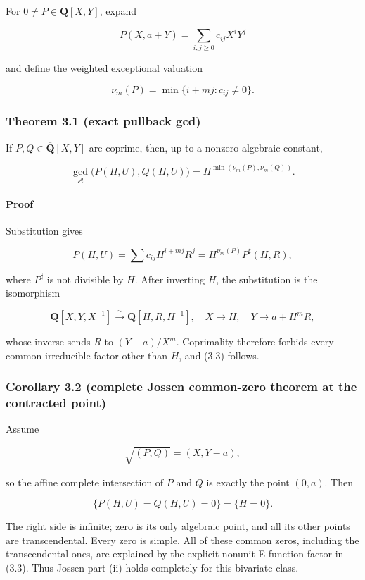 \documentclass[11pt]{article}
\theoremstyle{keio}
\theoremstyle{definition}
\theoremstyle{remark}
\begin{document}
For \(0\ne P\in\overline{\mathbf Q}[X,Y]\), expand

\[
  P(X,a+Y)=\sum_{i,j\ge0}c_{ij}X^iY^j
\]

and define the weighted exceptional valuation

\[
  \nu_m(P)=\min\{i+mj:c_{ij}\ne0\}.                          \tag{J-3.2}
\]

\subsubsection{Theorem 3.1 (exact pullback gcd)}

If \(P,Q\in\overline{\mathbf Q}[X,Y]\) are coprime, then, up to a nonzero
algebraic constant,

\[
 \gcd_{\mathscr A}\bigl(P(H,U),Q(H,U)\bigr)
 =H^{\min(\nu_m(P),\nu_m(Q))}.                               \tag{J-3.3}
\]

\paragraph{Proof}

Substitution gives

\[
  P(H,U)=\sum c_{ij}H^{i+mj}R^j
         =H^{\nu_m(P)}P^\sharp(H,R),
\]

where \(P^\sharp\) is not divisible by \(H\). After inverting \(H\), the
substitution is the isomorphism

\[
 \overline{\mathbf Q}[X,Y,X^{-1}]
 \xrightarrow{\sim}
 \overline{\mathbf Q}[H,R,H^{-1}],
 \quad X\mapsto H,\quad Y\mapsto a+H^mR,
\]

whose inverse sends \(R\) to \((Y-a)/X^m\). Coprimality therefore forbids
every common irreducible factor other than \(H\), and (3.3) follows.

\subsubsection{Corollary 3.2 (complete Jossen common-zero theorem at the contracted point)}

Assume

\[
  \sqrt{(P,Q)}=(X,Y-a),                                      \tag{J-3.4}
\]

so the affine complete intersection of \(P\) and \(Q\) is exactly the point
\((0,a)\). Then

\[
 \{P(H,U)=Q(H,U)=0\}=\{H=0\}.                               \tag{J-3.5}
\]

The right side is infinite; zero is its only algebraic point, and all its
other points are transcendental. Every zero is simple. All of these common
zeros, including the transcendental ones, are explained by the explicit
nonunit E-function factor in (3.3). Thus Jossen part (ii) holds completely
for this bivariate class.
\end{document}
